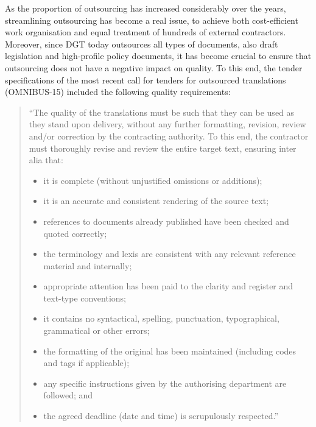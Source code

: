 \documentclass[output=paper]{langsci/langscibook}
\begin{document}
As the proportion of outsourcing has increased considerably over the years, streamlining outsourcing has become a real issue, to achieve both cost-efficient work organisation and equal treatment of hundreds of external contractors. Moreover, since DGT today outsources all types of documents, also draft legislation and high-profile policy documents, it has become crucial to ensure {that outsourcing does not have a negative impact on quality. To this end, the tender specifications of the most recent call for tenders for outsourced translations (OMNIBUS-15) included the following quality requirements:}

\begin{quotation}``The quality of the translations must be such that they can be used as they stand upon delivery, without any further formatting, revision, review and/or correction by the contracting authority. To this end, the contractor must thoroughly revise and review the entire target text, ensuring inter alia that:
\begin{itemize}
\item    
it is complete (without unjustified omissions or additions);

\item   
it is an accurate and consistent rendering of the source text;

\item  
references to documents already published have been checked and quoted correctly;

\item  
the terminology and lexis are consistent with any relevant reference material and internally;

\item  
appropriate attention has been paid to the clarity and register and text-type conventions;

\item  
it contains no syntactical, spelling, punctuation, typographical, grammatical or other errors; 

\item  
the formatting of the original has been maintained (including codes and tags if applicable);

\item  
any specific instructions given by the authorising department are followed; and

\item  
the agreed deadline (date and time) is scrupulously respected.''
\end{itemize}
\end{quotation}
\end{document}
